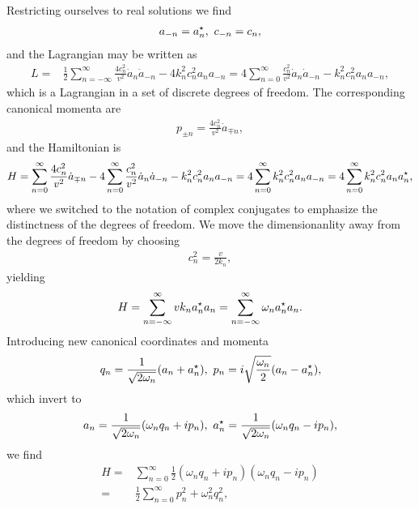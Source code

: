 Restricting ourselves to real solutions we find
\begin{align*}
	a_{-n} = a_{n}^{\star},\ c_{-n} = c_{n},
\end{align*}
and the Lagrangian may be written as
\begin{align*}
	L =& \frac{1}{2}\sum\limits_{n = -\infty}^{\infty}\frac{4c_{n}^{2}}{v^{2}}\dot{a}_{n}\dot{a}_{-n} - 4k_{n}^{2}c_{n}^{2}a_{n}a_{-n} = 4\sum\limits_{n = 0}^{\infty}\frac{c_{n}^{2}}{v^{2}}\dot{a}_{n}\dot{a}_{-n} - k_{n}^{2}c_{n}^{2}a_{n}a_{-n},
\end{align*}
which is a Lagrangian in a set of discrete degrees of freedom. The corresponding canonical momenta are
\begin{align*}
	p_{\pm n} = \frac{4c_{n}^{2}}{v^{2}}\dot{a}_{\mp n},
\end{align*}
and the Hamiltonian is
\begin{align*}
	H = \sum\limits_{n = 0}^{\infty}\frac{4c_{n}^{2}}{v^{2}}\dot{a}_{\mp n} - 4\sum\limits_{n = 0}^{\infty}\frac{c_{n}^{2}}{v^{2}}\dot{a}_{n}\dot{a}_{-n} - k_{n}^{2}c_{n}^{2}a_{n}a_{-n} = 4\sum\limits_{n = 0}^{\infty}k_{n}^{2}c_{n}^{2}a_{n}a_{-n} = 4\sum\limits_{n = 0}^{\infty}k_{n}^{2}c_{n}^{2}a_{n}a_{n}^{\star},
\end{align*}
where we switched to the notation of complex conjugates to emphasize the distinctness of the degrees of freedom. We move the dimensionanlity away from the degrees of freedom by choosing
\begin{align*}
	c_{n}^{2} = \frac{v}{2k_{n}},
\end{align*}
yielding
\begin{align*}
	H = \sum\limits_{n = -\infty}^{\infty}vk_{n}a_{n}^{\star} a_{n} = \sum\limits_{n = -\infty}^{\infty}\omega_{n}a_{n}^{\star} a_{n}.
\end{align*}
Introducing new canonical coordinates and momenta
\begin{align*}
	q_{n} = \frac{1}{\sqrt{2\omega_{n}}}(a_{n} + a_{n}^{\star}),\ p_{n} = i\sqrt{\frac{\omega_{n}}{2}}(a_{n} - a_{n}^{\star}),
\end{align*}
which invert to
\begin{align*}
	a_{n} = \frac{1}{\sqrt{2\omega_{n}}}(\omega_{n}q_{n} + ip_{n}),\ a_{n}\cc = \frac{1}{\sqrt{2\omega_{n}}}(\omega_{n}q_{n} - ip_{n}),
\end{align*}
we find
\begin{align*}
	H =& \sum\limits_{n = 0}^{\infty}\frac{1}{2}(\omega_{n}q_{n} + ip_{n})(\omega_{n}q_{n} - ip_{n}) \\ 
	  =& \frac{1}{2}\sum\limits_{n = 0}^{\infty}p_{n}^{2} + \omega_{n}^{2}q_{n}^{2},
\end{align*}

